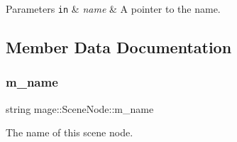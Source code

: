 \begin{DoxyParams}[1]{Parameters}
\mbox{\tt in}  & {\em name} & A pointer to the name. \\
\hline
\end{DoxyParams}


\subsection{Member Data Documentation}
\hypertarget{classmage_1_1_scene_node_a3ba13ec190df3e020c89d2ace0301dec}{}\label{classmage_1_1_scene_node_a3ba13ec190df3e020c89d2ace0301dec} 
\subsubsection{\texorpdfstring{m\+\_\+name}{m\_name}}
{\footnotesize\ttfamily string mage\+::\+Scene\+Node\+::m\+\_\+name\hspace{0.3cm}{\ttfamily [private]}}

The name of this scene node. 